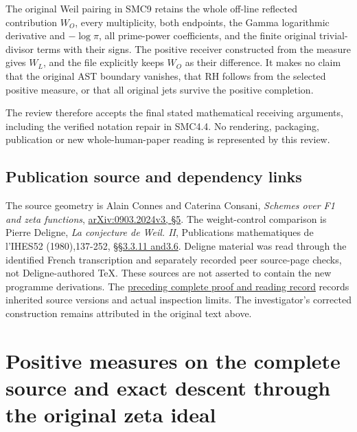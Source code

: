 The original Weil pairing in SMC9 retains the whole off-line reflected
contribution \(W_O\), every multiplicity, both endpoints, the Gamma
logarithmic derivative and \(-\log\pi\), all prime-power coefficients,
and the finite original trivial-divisor terms with their signs. The
positive receiver constructed from the measure gives \(W_L\), and the
file explicitly keeps \(W_O\) as their difference. It makes no claim
that the original AST boundary vanishes, that RH follows from the
selected positive measure, or that all original jets survive the
positive completion.

The review therefore accepts the final stated mathematical receiving
arguments, including the verified notation repair in SMC4.4. No
rendering, packaging, publication or new whole-human-paper reading is
represented by this review.

\section{Publication source and dependency
links}\label{publication-source-and-dependency-links-11}

The source geometry is Alain Connes and Caterina Consani, \emph{Schemes
over F1 and zeta functions},
\href{https://arxiv.org/abs/0903.2024v3}{arXiv:0903.2024v3, §5}. The
weight-control comparison is Pierre Deligne, \emph{La conjecture de
Weil. II}, Publications mathematiques de l'IHES52 (1980),137-252,
\href{https://www.numdam.org/item/PMIHES_1980__52__137_0/}{§§3.3.11
and3.6}. Deligne material was read through the identified French
transcription and separately recorded peer source-page checks, not
Deligne-authored TeX. These sources are not asserted to contain the new
programme derivations. The
\href{https://github.com/KokunoYumeto/zeta-function-research-reader/blob/36a82ecca98addb8a98b48204e349737856c7223/workbenches/splitzero-tandem/continuations/20260924-cohomology-weight-and-character-lifts/BUILD_AND_REVIEW.md}{preceding
complete proof and reading record} records inherited source versions and
actual inspection limits. The investigator's corrected construction
remains attributed in the original text above.

\chapter{Positive measures on the complete source and exact descent
through the original zeta
ideal}\label{positive-measures-on-the-complete-source-and-exact-descent-through-the-original-zeta-ideal}


